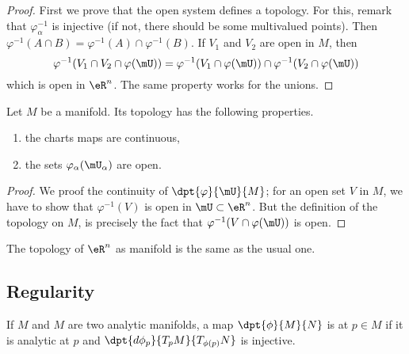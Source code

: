 \begin{proof}
    First we prove that the open system defines a topology. For this, remark that $\varphi_{\alpha}^{-1}$ is injective (if not, there should be some multivalued points). Then $\varphi^{-1}(A\cap B)=\varphi^{-1}(A)\cap\varphi^{-1}(B)$. If $V_1$ and $V_2$ are open in $M$, then
    \begin{equation}
        \varphi^{-1}(V_1\cap V_2\cap\varphi(\mU))=\varphi^{-1}(V_1\cap\varphi(\mU))\cap\varphi^{-1}(V_2\cap\varphi(\mU))
    \end{equation}
    which is open in $\eR^n$. The same property works for the unions.
\end{proof}

\begin{theorem}     \label{THOooIAXUooDqMrav}
    Let \( M\) be a manifold. Its topology has the following properties.
    \begin{enumerate}
        \item the charts maps are continuous,
        \item the sets $\varphi_{\alpha}(\mU_{\alpha})$ are open.
    \end{enumerate}
\end{theorem}

\begin{proof}
    We proof the continuity of $\dpt{\varphi}{\mU}{M}$; for an open set $V$ in $M$, we have to show that $\varphi^{-1}(V)$ is open in $\mU\subset\eR^n$. But the definition of the topology on $M$, is precisely the fact that $\varphi^{-1}(V\cap\varphi(\mU))$ is open.
\end{proof}

\begin{lemma}       \label{LEMooGDMZooLCtnuA}
    The topology of \( \eR^n\) as manifold is the same as the usual one.
\end{lemma}

\subsection{Regularity}

\begin{definition}      \label{DEFooMELXooEkEnwz}
    If $M$ and $M$ are two analytic manifolds, a map $\dpt{\phi}{M}{N}$ is \label{PgDefRegular} at $p\in M$ if it is analytic at $p$ and $\dpt{d\phi_p}{T_pM}{T_{\phi(p)}N}$ is injective.
\end{definition}

